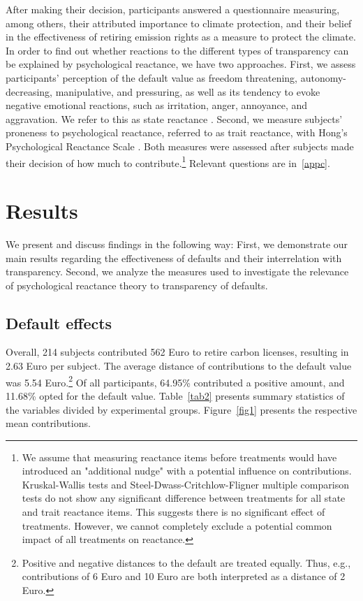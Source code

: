 \documentclass[review, authoryear,12pt]{elsarticle}
\begin{document}
After making their decision, participants answered a questionnaire measuring, among others, their attributed importance to climate protection, and their belief in the effectiveness of retiring emission rights as a measure to protect the climate. In order to find out whether reactions to the different types of transparency can be explained by psychological reactance, we have two approaches. First, we assess participants' perception of the default value as freedom threatening, autonomy-decreasing, manipulative, and pressuring, as well as its tendency to evoke negative emotional reactions, such as irritation, anger, annoyance, and aggravation. We refer to this as state reactance \citep{Dillard.2005}. Second, we measure subjects' proneness to psychological reactance, referred to as trait reactance, with Hong's Psychological Reactance Scale \citep{Hong.1996}. Both measures were assessed after subjects made their decision of how much to contribute.\footnote{We assume that measuring reactance items before treatments would have introduced an "additional nudge" with a potential influence on contributions. Kruskal-Wallis tests and Steel-Dwass-Critchlow-Fligner multiple comparison tests do not show any significant difference between treatments for all state and trait reactance items. This suggests there is no significant effect of treatments. However, we cannot completely exclude a potential common impact of all treatments on reactance.} Relevant questions are in~\ref{appc}.

\section{Results}
We present and discuss findings in the following way: First, we demonstrate our main results regarding the effectiveness of defaults and their interrelation with transparency. Second, we analyze the measures used to investigate the relevance of psychological reactance theory to transparency of defaults.

\subsection{Default effects}
Overall, 214 subjects contributed 562 Euro to retire carbon licenses, resulting in 2.63 Euro per subject. The average distance of contributions to the default value was 5.54 Euro.\footnote{Positive and negative distances to the default are treated equally. Thus, e.g., contributions of 6 Euro  and 10 Euro  are both interpreted as a distance of 2 Euro.} Of all participants, 64.95\% contributed a positive amount, and 11.68\% opted for the default value. Table~\ref{tab2} presents summary statistics of the variables divided by experimental groups. Figure~\ref{fig1} presents the respective mean contributions.
\end{document}
